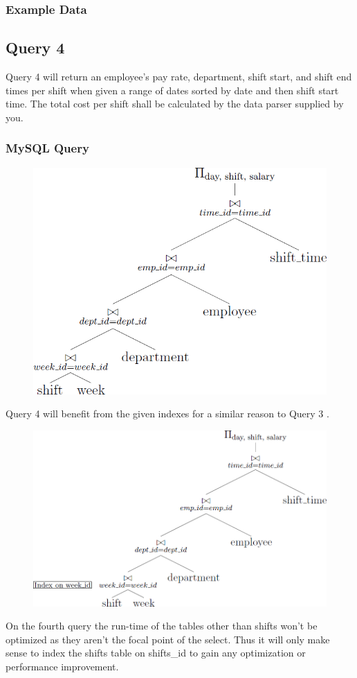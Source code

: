 \documentclass[letter,12pt]{texMemo}
\begin{document}
\subsubsection*{Example Data}
\begin{changemargin}{-1.25cm}{-1.25cm}
	\begin{center}
		
	\end{center}
\end{changemargin}

\subsection*{Query 4}
Query 4 will return an employee's pay rate, department, shift start, and shift end times per shift when given a range of dates sorted by date and then shift start time. The total cost per shift shall be calculated by the data parser supplied by you.
\subsubsection*{MySQL Query}
	
\begin{figure}[H]
	\centering
	\includegraphics[width=.5\textwidth]{query4.png}
\end{figure}
Query 4 will benefit from the given indexes for a similar reason to Query 3
.\begin{figure}[H]
	\centering
	\includegraphics[width=.5\textwidth]{query4_indexed.png}
\end{figure}
On the fourth query the run-time of the tables other than shifts won't be optimized as they aren't the focal point of the select. Thus it will only make sense to index the shifts table on shifts\_id to gain any optimization or performance improvement.  
\vspace{1em}
\end{document}
